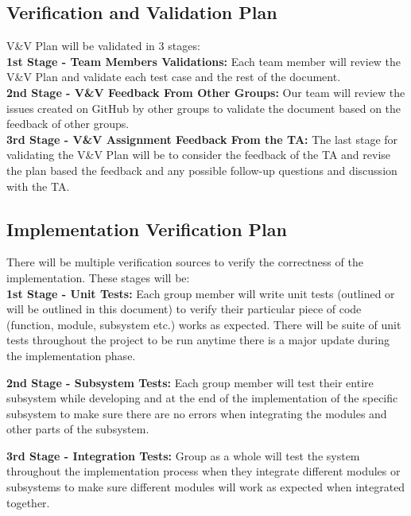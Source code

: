 \documentclass[12pt, titlepage]{article}
\begin{document}
\subsection{Verification and Validation Plan}


V\&V Plan will be validated in 3 stages:\\
\textbf{1st Stage - Team Members Validations:} Each team member will review the V\&V Plan and validate each test case and the rest of the document.\\
\textbf{2nd Stage - V\&V Feedback From Other Groups:} Our team will review the issues created on GitHub by other groups to validate the document based on the feedback of other groups.\\
\textbf{3rd Stage - V\&V Assignment Feedback From the TA:} The last stage for validating the V\&V Plan will be to consider the feedback of the TA and revise the plan based the feedback and any possible follow-up questions and discussion with the TA.



\subsection{Implementation Verification Plan}

There will be multiple verification sources to verify the correctness of the implementation. These stages will be:\\

\textbf{1st Stage - Unit Tests:} Each group member will write unit tests (outlined or will be outlined in this document) to verify their particular piece of code (function, module, subsystem etc.) works as expected. There will be suite of unit tests throughout the project to be run anytime there is a major update during the implementation phase.

\textbf{2nd Stage - Subsystem Tests:} Each group member will test their entire subsystem while developing and at the end of the implementation of the specific subsystem to make sure there are no errors when integrating the modules and other parts of the subsystem.

\textbf{3rd Stage - Integration Tests:} Group as a whole will test the system throughout the implementation process when they integrate different modules or subsystems to make sure different modules will work as expected when integrated together.
\end{document}
